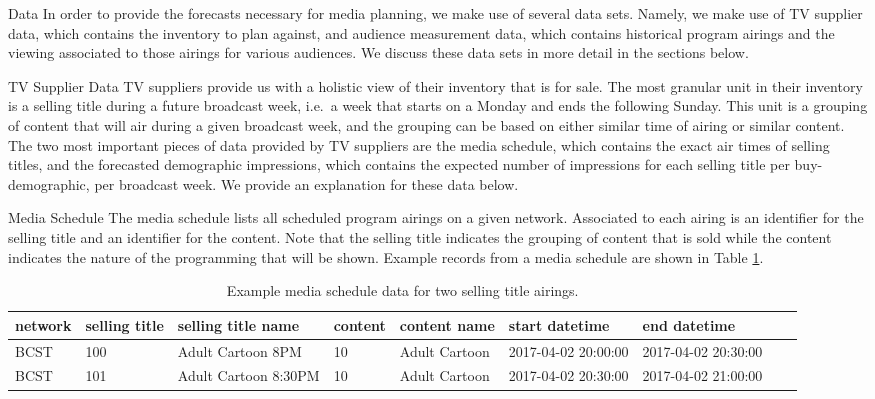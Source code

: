 \begin{chapter}{Data}\label{data}
  In order to provide the forecasts necessary for media planning, we make use
  of several data sets. Namely, we make use of TV supplier data, which contains the inventory to plan against, and
  audience measurement data, which contains historical program airings and the
  viewing associated to those airings for various audiences. We discuss
  these data sets in more detail in the sections below.

\begin{section}{TV Supplier Data}
  TV suppliers provide us with a holistic view of their inventory that is for sale.
  The most granular unit in their inventory is a selling title during a future broadcast week, i.e.\ a
  week that starts on a Monday and ends the following Sunday. This
  unit is a grouping of content that will air during a given broadcast week, and the grouping can be
  based on either similar time of airing or similar content. The two most important
  pieces of data provided by TV suppliers are the media schedule, which contains the exact air times of
  selling titles, and the forecasted demographic impressions, which contains the
  expected number of impressions for each selling title per buy-demographic, per broadcast week. We
  provide an explanation for these data below.

  \begin{subsection}{Media Schedule}
    The media schedule lists all scheduled program airings on a given network.
    Associated to each airing is an identifier for the selling title and an identifier for the content.
    Note that the selling title indicates the grouping of content that is sold while the content
    indicates the nature of the programming that will be shown. Example records
    from a media schedule are shown in Table \ref{tab:tvsched}.

    \begin{table}[h!]
      \centering
      \begin{adjustbox}{width=1.1\textwidth,center=\textwidth}
        \large
        \begin{tabular}{lllllllll}
          network & selling title & selling title name & content & content name & start datetime & end datetime \\
          \hline
          BCST & 100 & Adult Cartoon 8PM & 10 & Adult Cartoon & 2017-04-02 20:00:00 & 2017-04-02 20:30:00 \\
          BCST & 101 & Adult Cartoon 8:30PM & 10 & Adult Cartoon & 2017-04-02 20:30:00 & 2017-04-02 21:00:00 \\
        \end{tabular}
      \end{adjustbox}
      \caption{Example media schedule data for two selling title airings.}\label{tab:tvsched}
    \end{table}


\end{subsection}
\end{section}
\end{chapter}
